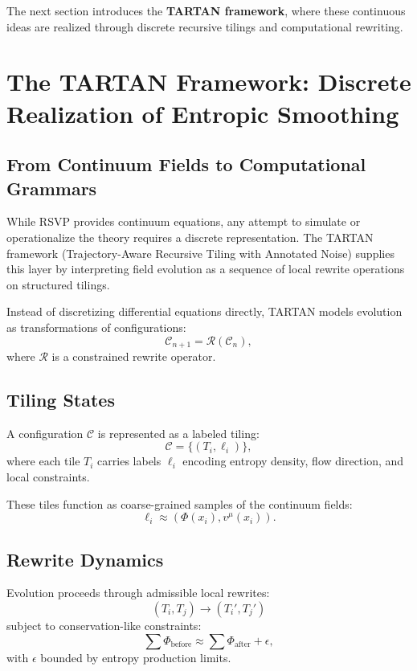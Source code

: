 \documentclass[12pt]{article}
\begin{document}
\bigskip

The next section introduces the \textbf{TARTAN framework}, where these continuous ideas are realized through discrete recursive tilings and computational rewriting.

\section{The TARTAN Framework: Discrete Realization of Entropic Smoothing}

\subsection{From Continuum Fields to Computational Grammars}

While RSVP provides continuum equations, any attempt to simulate or operationalize the theory requires a discrete representation. The TARTAN framework (Trajectory-Aware Recursive Tiling with Annotated Noise) supplies this layer by interpreting field evolution as a sequence of local rewrite operations on structured tilings.

Instead of discretizing differential equations directly, TARTAN models evolution as transformations of configurations:
\[
\mathcal{C}_{n+1} = \mathcal{R}(\mathcal{C}_n),
\]
where $\mathcal{R}$ is a constrained rewrite operator.

\subsection{Tiling States}

A configuration $\mathcal{C}$ is represented as a labeled tiling:
\[
\mathcal{C} = \{ (T_i, \ell_i) \},
\]
where each tile $T_i$ carries labels $\ell_i$ encoding entropy density, flow direction, and local constraints.

These tiles function as coarse-grained samples of the continuum fields:
\[
\ell_i \approx (\Phi(x_i), v^\mu(x_i)).
\]

\subsection{Rewrite Dynamics}

Evolution proceeds through admissible local rewrites:
\[
(T_i, T_j) \longrightarrow (T_i', T_j')
\]
subject to conservation-like constraints:
\[
\sum \Phi_{\text{before}} \approx \sum \Phi_{\text{after}} + \epsilon,
\]
with $\epsilon$ bounded by entropy production limits.
\end{document}
